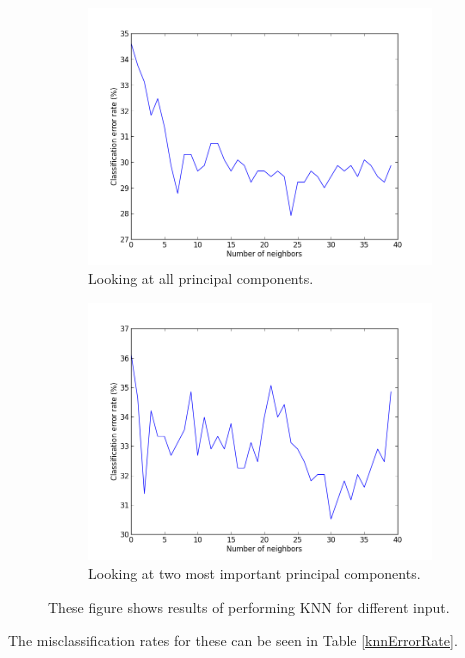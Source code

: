 \begin{figure}[H]
	\begin{subfigure}[b]{0.5\textwidth}
	\includegraphics[scale=0.3]{pictures/knnPC.png}
	\caption{Looking at all principal components.}
	\label{knnResultXPA}
	\end{subfigure}
	\begin{subfigure}[b]{0.5\textwidth}
	\includegraphics[scale=0.3]{pictures/knn2PC.png}
	\caption{Looking at two most important principal components.}
	\label{knnResultX2PA}
	\end{subfigure}
\caption{These figure shows results of performing KNN for different input.}
\label{knnResults}
\end{figure}

The misclassification rates for these can be seen in Table \ref{knnErrorRate}.

